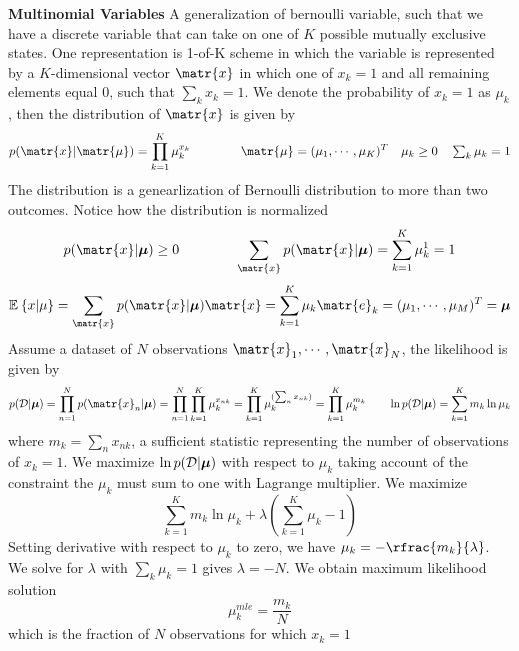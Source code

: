 \documentclass[11pt]{article}
\begin{document}


\begin{defn*}
    \textbf{Multinomial Variables} A generalization of bernoulli variable, such that we have a discrete variable that can take on one of $K$ possible mutually exclusive states. One representation is 1-of-K scheme in which the variable is represented by a $K$-dimensional vector $\matr{x}$ in which one of $x_k = 1$ and all remaining elements equal 0, such that $\textstyle\sum_k x_k = 1$. We denote the probability of $x_k=1$ as $\mu_k$, then the distribution of $\matr{x}$ is given by 
    \[
        p(\matr{x}|\matr{\mu}) = \prod_{k=1}^K \mu_k^{x_k}
        \quad \quad \quad \quad 
        \matr{\mu} = (\mu_1,\cdots,\mu_K)^T 
        \quad 
        \mu_k \geq 0 \quad \textstyle\sum_k \mu_k = 1
    \]
    The distribution is a genearlization of Bernoulli distribution to more than two outcomes. Notice how the distribution is normalized 
    \[
        p(\matr{x}|\bmu) \geq 0
        \quad \quad \quad \quad 
        \sum_{\matr{x}} p(\matr{x}|\bmu) = \sum_{k=1}^K \mu_k^1 = 1
    \]
    \[
        \E{x|\mu} = \sum_{\matr{x}} p(\matr{x}|\bmu)\matr{x} = \sum_{k=1}^K \mu_k \matr{e}_k = (\mu_1, \cdots, \mu_M)^T = \bmu
    \]
    Assume a dataset of $N$ observations $\matr{x}_1,\cdots, \matr{x}_N$, the likelihood is given by 
    \[
        p(\mathcal{D}|\bmu) = \prod_{n=1}^N p(\matr{x}_n | \bmu)
        = \prod_{n=1}^N \prod_{k=1}^K \mu_k^{x_{nk}} 
        = \prod_{k=1}^K \mu_k^{(\sum_n x_{nk})} 
        = \prod_{k=1}^K \mu_k^{m_k}
        \quad\quad 
        \ln{p(\mathcal{D}|\bmu)} = \sum_{k=1}^K m_k \ln{\mu_k}
    \]
    where $m_k = \textstyle\sum_n x_{nk}$, a sufficient statistic representing the number of observations of $x_k =1$. We maximize $\ln{p(\mathcal{D}|\boldsymbol{\mu})}$ with respect to $\mu_k$ taking account of the constraint the $\mu_k$ must sum to one with Lagrange multiplier. We maximize 
    \[
        \sum_{k=1}^K m_k \ln{\mu_k} + \lambda \left( \sum_{k=1}^K \mu_k - 1 \right)
    \]
    Setting derivative with respect to $\mu_k$ to zero, we have $\mu_k = - \rfrac{m_k}{\lambda}$. We solve for $\lambda$ with $\textstyle \sum_k \mu_k = 1$ gives $\lambda = -N$. We obtain maximum likelihood solution 
    \[
        \mu_k^{mle} = \frac{m_k}{N}    
    \]
    which is the fraction of $N$ observations for which $x_k =1$
\end{defn*}
\end{document}
